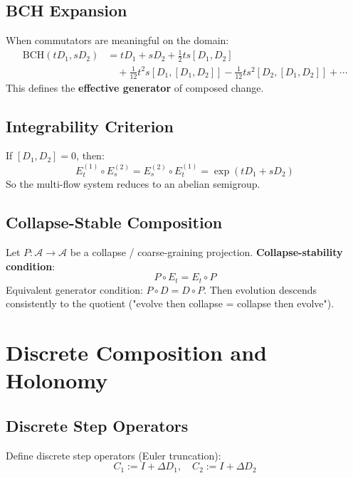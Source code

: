 \documentclass[12pt, oneside]{article}
\begin{document}
\subsection{BCH Expansion}

When commutators are meaningful on the domain:
\begin{align}
\text{BCH}(tD_1, sD_2) &= tD_1 + sD_2 + \frac{1}{2} ts [D_1, D_2] \\
&\quad + \frac{1}{12} t^2 s [D_1, [D_1, D_2]] - \frac{1}{12} t s^2 [D_2, [D_1, D_2]] + \cdots
\end{align}
This defines the \textbf{effective generator} of composed change.

\subsection{Integrability Criterion}

If $[D_1, D_2] = 0$, then:
\begin{equation}
E_t^{(1)} \circ E_s^{(2)} = E_s^{(2)} \circ E_t^{(1)} = \exp(tD_1 + sD_2)
\end{equation}
So the multi-flow system reduces to an abelian semigroup.

\subsection{Collapse-Stable Composition}

Let $P: \mathcal{A} \rightarrow \mathcal{A}$ be a collapse / coarse-graining projection. \textbf{Collapse-stability condition}:
\begin{equation}
P \circ E_t = E_t \circ P
\end{equation}
Equivalent generator condition: $P \circ D = D \circ P$. Then evolution descends consistently to the quotient ("evolve then collapse = collapse then evolve").

\section{Discrete Composition and Holonomy}

\subsection{Discrete Step Operators}

Define discrete step operators (Euler truncation):
\begin{equation}
C_1 := I + \Delta D_1, \quad C_2 := I + \Delta D_2
\end{equation}
\end{document}
